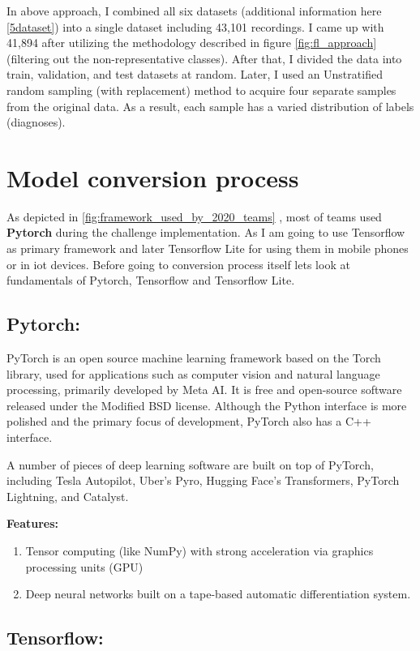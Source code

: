 In above approach, I combined all six datasets (additional information here \ref{5dataset}) into a single dataset including 43,101 recordings. I came up with 41,894 after utilizing the methodology described in figure \ref{fig:fl_approach} (filtering out the non-representative classes). After that, I divided the data into train, validation, and test datasets at random. Later, I used an Unstratified random sampling (with replacement) method to acquire four separate samples from the original data. As a result, each sample has a varied distribution of labels (diagnoses).


\section{Model conversion process} \label{4mconverionp}

As depicted in \ref{fig:framework_used_by_2020_teams} , most of teams used \textbf{Pytorch} during the challenge implementation. As I am going to use Tensorflow as primary framework and later Tensorflow Lite for using them in mobile phones or in iot devices. Before going to conversion process itself lets look at fundamentals of Pytorch, Tensorflow and Tensorflow Lite.
\subsection{Pytorch:}
PyTorch is an open source machine learning framework based on the Torch library, used for applications such as computer vision and natural language processing, primarily developed by Meta AI. It is free and open-source software released under the Modified BSD license. Although the Python interface is more polished and the primary focus of development, PyTorch also has a C++ interface.

A number of pieces of deep learning software are built on top of PyTorch, including Tesla Autopilot, Uber's Pyro, Hugging Face's Transformers, PyTorch Lightning, and Catalyst.

\break
\textbf{Features:}
\begin{enumerate}
  \item Tensor computing (like NumPy) with strong acceleration via graphics processing units (GPU)
  \item Deep neural networks built on a tape-based automatic differentiation system.
\end{enumerate}


\subsection{Tensorflow:}

